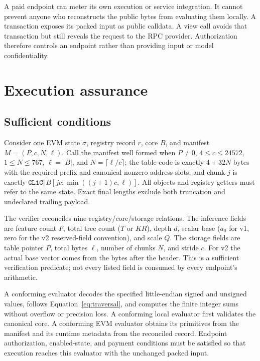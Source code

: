 \documentclass{ledger}
\newcommand{\codeword}[1]{\texttt{#1}}
\begin{document}
A paid endpoint can meter its own execution or service integration. It cannot
prevent anyone who reconstructs the public bytes from evaluating them
locally. A transaction exposes its packed input as public calldata. A view
call avoids that transaction but still reveals the request to the RPC
provider. Authorization therefore controls an endpoint rather than providing
input or model confidentiality.

\section{Execution assurance}
\label{sec:assurance}

\subsection{Sufficient conditions}

Consider one EVM state $\sigma$, registry record $r$, core $B$, and manifest
$M=(P,c,N,\ell)$. Call the manifest well formed when $P\ne0$,
$4\le c\le24572$, $1\le N\le767$, $\ell=|B|$, and
$N=\lceil\ell/c\rceil$; the table code is exactly $4+32N$ bytes with the
required prefix and canonical nonzero address slots; and chunk $j$ is exactly
$\codeword{GL1C}\Vert B[jc:\min((j+1)c,\ell)]$. All objects and registry
getters must refer to the same state. Exact final lengths exclude both
truncation and undeclared trailing payload.

The verifier reconciles nine registry/core/storage relations. The inference
fields are feature count $F$, total tree count ($T$ or $KR$), depth $d$,
scalar base ($a_0$ for v1, zero for the v2 reserved-field convention), and
scale $Q$. The storage fields are table pointer $P$, total bytes $\ell$,
number of chunks $N$, and stride $c$. For v2 the actual base vector comes
from the bytes after the header. This is a sufficient verification predicate;
not every listed field is consumed by every endpoint's arithmetic.

A conforming evaluator decodes the specified little-endian signed and
unsigned values, follows Equation~\ref{eq:traversal}, and computes the finite
integer sums without overflow or precision loss. A conforming local evaluator
first validates the canonical core. A conforming EVM evaluator obtains its
primitives from the manifest and its runtime metadata from the reconciled
record. Endpoint authorization, enabled-state, and payment conditions must be
satisfied so that execution reaches this evaluator with the unchanged packed
input.
\end{document}
